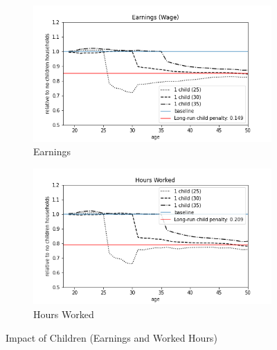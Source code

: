 \begin{figure}[ht]
\begin{subfigure}{.5\textwidth}
  \centering
  \includegraphics[width=1\linewidth]{figures/extended_model_event_earnings.png}
  \caption{Earnings}
  \label{fig:ext_model_event_earnings}
\end{subfigure}%
\begin{subfigure}{.5\textwidth}
  \centering
  \includegraphics[width=1\linewidth]{figures/extended_model_event_hours_worked.png}
  \caption{Hours Worked}
  \label{fig:ext_model_event_hours}
\end{subfigure}
    \caption{Impact of Children (Earnings and Worked Hours)}
    \label{fig:ext_model_impact_earnings_hours}
\end{figure}

